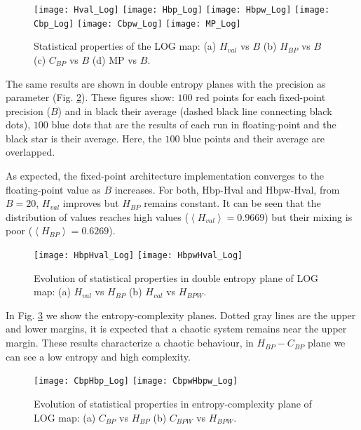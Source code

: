 \begin{figure}
	\texttt{[image: Hval\_Log]}
	\texttt{[image: Hbp\_Log]}
	\texttt{[image: Hbpw\_Log]}
	\texttt{[image: Cbp\_Log]}
	\texttt{[image: Cbpw\_Log]}
	\texttt{[image: MP\_Log]}
	\caption{Statistical properties of the LOG map: (a) $H_{val}$ vs $B$ (b) $H_{BP}$ vs $B$ (c) $C_{BP}$ vs $B$ (d) MP vs $B$.}
	\label{fig:LOG_QuantiB}
\end{figure}

The same results are shown in double entropy planes with the precision as parameter (Fig. \ref{fig:LOG_HH}).
These figures show: $100$ red points for each fixed-point precision ($B$) and in black their average (dashed black line connecting black dots), $100$ blue dots that are the results of each run in floating-point and the black star is their average.
Here, the $100$ blue points and their average are overlapped.

As expected, the fixed-point architecture implementation converges to the floating-point value as $B$ increases.
For both, Hbp-Hval and Hbpw-Hval, from $B=20$, $H_{val}$ improves but $H_{BP}$ remains constant.
It can be seen that the distribution of values reaches high values ($\left\langle H_{val}\right\rangle =0.9669$) but their mixing is poor ($\left\langle H_{BP}\right\rangle =0.6269$).

\begin{figure}
	\texttt{[image: HbpHval\_Log]}
	\texttt{[image: HbpwHval\_Log]}
	\caption{Evolution of statistical properties in double entropy plane of LOG map: (a) $H_{val}$ vs $H_{BP}$ (b) $H_{val}$ vs $H_{BPW}$.}
	\label{fig:LOG_HH}
\end{figure}

In Fig. \ref{fig:LOG_HC} we show the entropy-complexity planes.
Dotted gray lines are the upper and lower margins, it is expected that a chaotic system remains near the upper margin.
These results characterize a chaotic behaviour, in $H_{BP}-C_{BP}$ plane we can see a low entropy and high complexity.

\begin{figure}
	\texttt{[image: CbpHbp\_Log]}
	\texttt{[image: CbpwHbpw\_Log]}
	\caption{Evolution of statistical properties in entropy-complexity plane of LOG map: (a) $C_{BP}$ vs $H_{BP}$ (b) $C_{BPW}$ vs $H_{BPW}$.}
	\label{fig:LOG_HC}
\end{figure}
